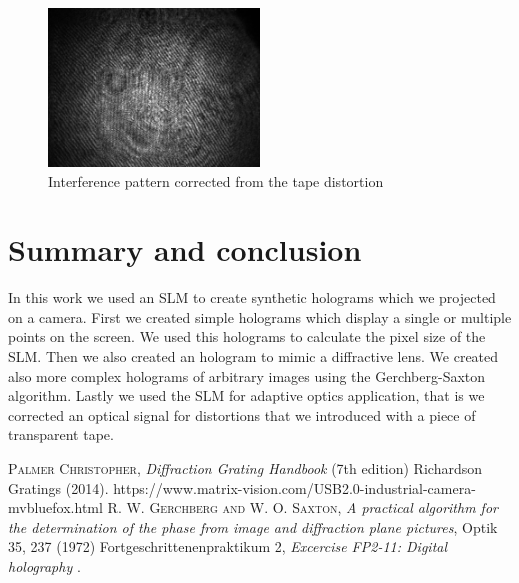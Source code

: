 \documentclass[a4paper,10pt]{article}
\begin{document}
\begin{figure}[H]
\centering
\includegraphics[width=0.5\textwidth]{corrected}
\caption{Interference pattern corrected from the tape distortion}\label{corrected}
\end{figure}
\section{Summary and conclusion}
In this work we used an SLM to create synthetic holograms which we projected on a camera. First we created simple holograms which display a single or multiple points on the screen. We used this holograms to calculate the pixel size of the SLM. Then we also created an hologram to mimic a diffractive lens. We created also more complex holograms of arbitrary images using the Gerchberg-Saxton algorithm. Lastly we used the SLM for adaptive optics application, that is we corrected an optical signal for distortions that we introduced with a piece of transparent tape.

\begin{thebibliography}{99}
\textsc{Palmer Christopher}, \textit{Diffraction Grating Handbook} (7th edition) Richardson Gratings (2014). 
 https://www.matrix-vision.com/USB2.0-industrial-camera-mvbluefox.html
 \textsc{R. W. Gerchberg and W. O. Saxton}, \textit{A practical algorithm for the determination of the phase from image and diffraction plane pictures}, Optik 35, 237 (1972)
Fortgeschrittenenpraktikum 2, \textit{Excercise FP2-11: Digital holography
}.
\end{thebibliography}
\end{document}
